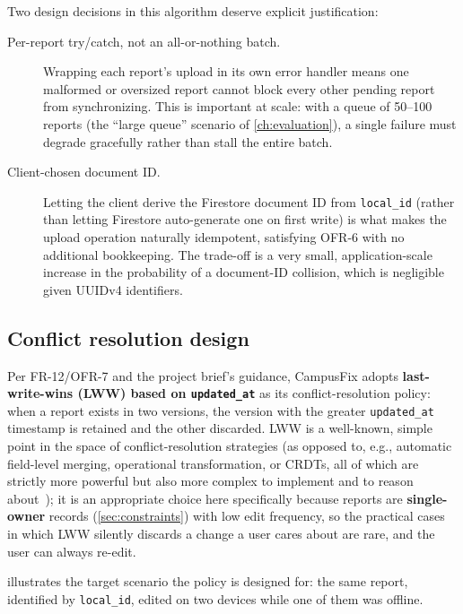 Two design decisions in this algorithm deserve explicit justification:

\begin{description}
  \item[Per-report try/catch, not an all-or-nothing batch.] Wrapping each
  report's upload in its own error handler means one malformed or
  oversized report cannot block every other pending report from
  synchronizing. This is important at scale: with a queue of 50--100
  reports (the \enquote{large queue} scenario of
  \cref{ch:evaluation}), a single failure must degrade gracefully rather
  than stall the entire batch.
  \item[Client-chosen document ID.] Letting the client derive the
  Firestore document ID from \texttt{local\_id} (rather than letting
  Firestore auto-generate one on first write) is what makes the upload
  operation naturally idempotent, satisfying OFR-6 with no additional
  bookkeeping. The trade-off is a very small, application-scale increase
  in the probability of a document-ID collision, which is negligible
  given UUIDv4 identifiers.
\end{description}

\subsection{Conflict resolution design}
\label{sec:conflict-design}

Per FR-12/OFR-7 and the project brief's guidance, CampusFix adopts
\textbf{last-write-wins (LWW) based on \texttt{updated\_at}} as its
conflict-resolution policy: when a report exists in two versions, the
version with the greater \texttt{updated\_at} timestamp is retained and
the other discarded. LWW is a well-known, simple point in the space of
conflict-resolution strategies (as opposed to, e.g., automatic
field-level merging, operational transformation, or CRDTs, all of which
are strictly more powerful but also more complex to implement and to
reason about~\cite{shapiro2011crdt,terry1995bayou}); it is an
appropriate choice here specifically because reports are
\textbf{single-owner} records (\cref{sec:constraints}) with low edit
frequency, so the practical cases in which LWW silently discards a change
a user cares about are rare, and the user can always re-edit.

 illustrates the target scenario the policy is
designed for: the same report, identified by \texttt{local\_id}, edited on
two devices while one of them was offline.


